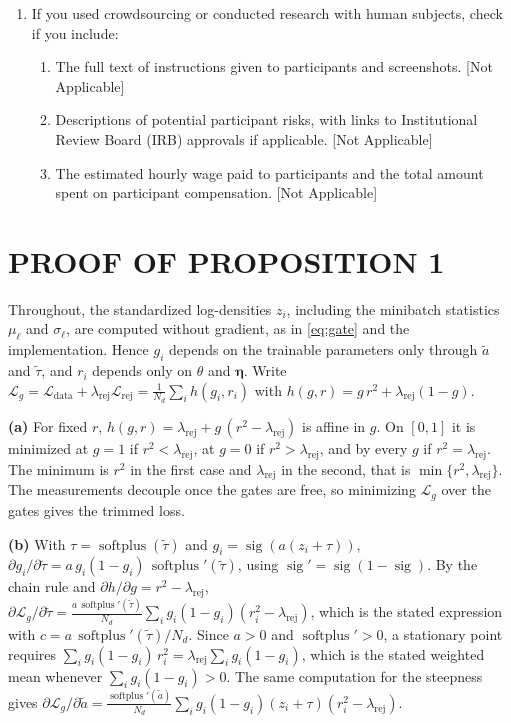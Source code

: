 \documentclass[twoside]{article}
\newcommand{\rej}{\lambda_{\mathrm{rej}}}
\DeclareMathOperator{\sig}{sig}
\DeclareMathOperator{\softplus}{softplus}
\begin{document}
\begin{enumerate}
  \item If you used crowdsourcing or conducted research with human subjects,
  check if you include:
  \begin{enumerate}
    \item The full text of instructions given to participants and screenshots.
    [Not Applicable]
    \item Descriptions of potential participant risks, with links to
    Institutional Review Board (IRB) approvals if applicable. [Not Applicable]
    \item The estimated hourly wage paid to participants and the total amount
    spent on participant compensation. [Not Applicable]
  \end{enumerate}

\end{enumerate}

\clearpage
\appendix
\thispagestyle{empty}
\onecolumn
{}

\section{PROOF OF PROPOSITION 1}
\label{app:proof}

Throughout, the standardized log-densities $z_i$, including the minibatch
statistics $\mu_\ell$ and $\sigma_\ell$, are computed without gradient, as in
\cref{eq:gate} and the implementation. Hence $g_i$ depends on the trainable
parameters only through $\tilde a$ and $\tilde\tau$, and $r_i$ depends only on
$\theta$ and $\boldsymbol\eta$. Write
$\mathcal{L}_g = \mathcal{L}_{\mathrm{data}} + \rej\mathcal{L}_{\mathrm{rej}}
= \frac{1}{N_d}\sum_i h(g_i, r_i)$ with $h(g, r) = g\,r^2 + \rej(1-g)$.

\textbf{(a)} For fixed $r$, $h(g, r) = \rej + g\,(r^2 - \rej)$ is affine in $g$.
On $[0,1]$ it is minimized at $g = 1$ if $r^2 < \rej$, at $g = 0$ if
$r^2 > \rej$, and by every $g$ if $r^2 = \rej$. The minimum is $r^2$ in the first
case and $\rej$ in the second, that is $\min\{r^2, \rej\}$. The measurements
decouple once the gates are free, so minimizing $\mathcal{L}_g$ over the gates
gives the trimmed loss.

\textbf{(b)} With $\tau = \softplus(\tilde\tau)$ and $g_i = \sig(a(z_i+\tau))$,
$\partial g_i/\partial\tilde\tau = a\, g_i(1-g_i)\,\softplus'(\tilde\tau)$, using
$\sig' = \sig(1-\sig)$. By the chain rule and $\partial h/\partial g = r^2 - \rej$,
$\partial\mathcal{L}_g/\partial\tilde\tau =
\frac{a\,\softplus'(\tilde\tau)}{N_d}\sum_i g_i(1-g_i)(r_i^2 - \rej)$, which is the
stated expression with $c = a\,\softplus'(\tilde\tau)/N_d$. Since
$a > 0$ and $\softplus' > 0$, a stationary point requires
$\sum_i g_i(1-g_i)\, r_i^2 = \rej \sum_i g_i(1-g_i)$, which is the stated
weighted mean whenever $\sum_i g_i(1-g_i) > 0$. The same computation for the
steepness gives $\partial\mathcal{L}_g/\partial\tilde a =
\frac{\softplus'(\tilde a)}{N_d}\sum_i g_i(1-g_i)(z_i + \tau)(r_i^2 - \rej)$.
\end{document}
